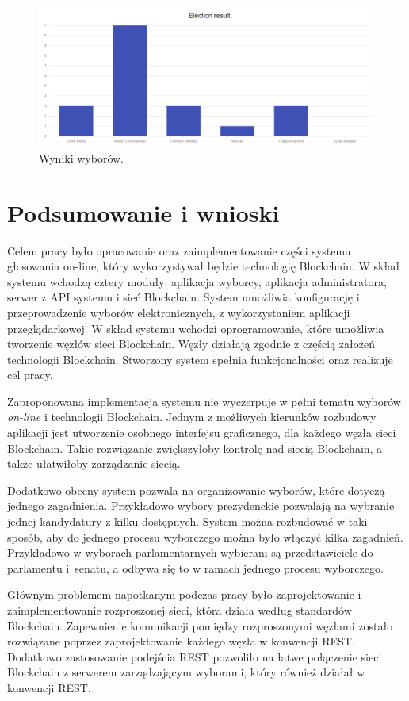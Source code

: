\documentclass[a4paper,12pt]{book}
\begin{document}
\begin{figure}[H]
  \centering
\includegraphics[width=\textwidth]{images/ezresult.png}
\caption{Wyniki wyborów.}\label{ezresult}
\end {figure}

\chapter{Podsumowanie i wnioski}

Celem pracy było opracowanie oraz zaimplementowanie części systemu głosowania on-line, który wykorzystywał będzie technologię Blockchain. W skład systemu wchodzą cztery moduły: aplikacja wyborcy, aplikacja administratora, serwer z API systemu i sieć Blockchain. System umożliwia konfigurację  i przeprowadzenie wyborów elektronicznych, z wykorzystaniem aplikacji przeglądarkowej. W skład systemu wchodzi oprogramowanie, które umożliwia tworzenie węzłów sieci Blockchain. Węzły działają zgodnie z częścią założeń technologii Blockchain. Stworzony system spełnia funkcjonalności oraz realizuje cel pracy.
 
Zaproponowana implementacja systemu nie wyczerpuje w pełni tematu wyborów \textit{on-line} i technologii Blockchain. Jednym z możliwych kierunków rozbudowy aplikacji jest utworzenie osobnego interfejsu graficznego, dla każdego węzła sieci Blockchain. Takie rozwiązanie zwiększyłoby kontrolę nad siecią Blockchain, a także ułatwiłoby zarządzanie siecią.
 
Dodatkowo obecny system pozwala na organizowanie wyborów, które dotyczą jednego zagadnienia. Przykładowo wybory prezydenckie pozwalają na wybranie jednej kandydatury z kilku dostępnych. System można rozbudować w taki sposób, aby do jednego procesu wyborczego można było włączyć kilka zagadnień. Przykładowo w wyborach parlamentarnych wybierani są przedstawiciele do parlamentu i~senatu, a odbywa się to w ramach jednego procesu wyborczego.
 
Głównym problemem napotkanym podczas pracy było zaprojektowanie i zaimplementowanie rozproszonej sieci, która działa według standardów Blockchain. Zapewnienie komunikacji pomiędzy rozproszonymi węzłami zostało rozwiązane poprzez zaprojektowanie każdego węzła w konwencji REST. Dodatkowo zastosowanie podejścia REST pozwoliło na łatwe połączenie sieci Blockchain z serwerem zarządzającym wyborami, który również działał w konwencji REST.
 
\end{document}

